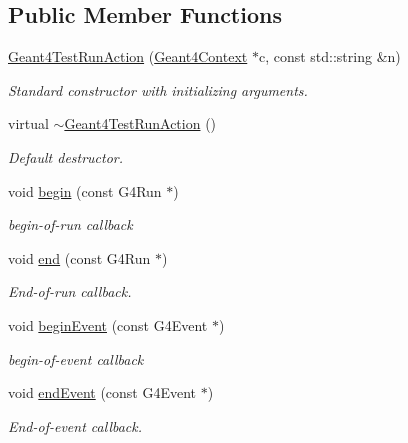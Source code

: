 \subsection*{Public Member Functions}
\begin{DoxyCompactItemize}
\item 
\hyperlink{class_d_d4hep_1_1_simulation_1_1_test_1_1_geant4_test_run_action_a59369c3b9a84e951c2885a3ec331b360}{Geant4\+Test\+Run\+Action} (\hyperlink{class_d_d4hep_1_1_simulation_1_1_geant4_context}{Geant4\+Context} $\ast$c, const std\+::string \&n)
\begin{DoxyCompactList}\small\item\em Standard constructor with initializing arguments. \end{DoxyCompactList}\item 
virtual \hyperlink{class_d_d4hep_1_1_simulation_1_1_test_1_1_geant4_test_run_action_a6ce0a9785be8b5d86be20d2bc5a3db64}{$\sim$\+Geant4\+Test\+Run\+Action} ()
\begin{DoxyCompactList}\small\item\em Default destructor. \end{DoxyCompactList}\item 
void \hyperlink{class_d_d4hep_1_1_simulation_1_1_test_1_1_geant4_test_run_action_a1df121c6a80d42e72c898e7303d5c64e}{begin} (const G4\+Run $\ast$)
\begin{DoxyCompactList}\small\item\em begin-\/of-\/run callback \end{DoxyCompactList}\item 
void \hyperlink{class_d_d4hep_1_1_simulation_1_1_test_1_1_geant4_test_run_action_a9cffefeecef4c952ad1fbbc80893aac8}{end} (const G4\+Run $\ast$)
\begin{DoxyCompactList}\small\item\em End-\/of-\/run callback. \end{DoxyCompactList}\item 
void \hyperlink{class_d_d4hep_1_1_simulation_1_1_test_1_1_geant4_test_run_action_af1b4e87826ebabd5a73c9fc4a1f853d5}{begin\+Event} (const G4\+Event $\ast$)
\begin{DoxyCompactList}\small\item\em begin-\/of-\/event callback \end{DoxyCompactList}\item 
void \hyperlink{class_d_d4hep_1_1_simulation_1_1_test_1_1_geant4_test_run_action_ae93d60ada35540e3801472025ff23ded}{end\+Event} (const G4\+Event $\ast$)
\begin{DoxyCompactList}\small\item\em End-\/of-\/event callback. \end{DoxyCompactList}\end{DoxyCompactItemize}

